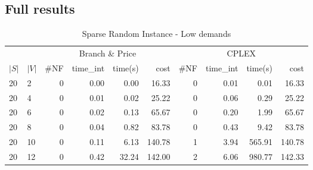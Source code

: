\appendix

\begin{appendices}
\chapter{Full results}

\begin{table*}[h]
\tiny
\begin{center}
\caption{Sparse Random Instance - Low demands}\label{tab:fullbegin}
\begin{tabular} {l l | r r r r | r r r r}
\hline
       &                                &  \multicolumn{4}{c|}{Branch \& Price}                                & \multicolumn{4}{c}{CPLEX}                 \\
 $|S|$ & $|V|$                          &  \#NF    &  time\_int    &  time(s)       &  cost          &  \#NF &  time\_int  &  time(s)       &  cost          \\ 
\hline                                                                                                                           
 20 & 2                                  &   0             & 0.00          &  0.00       &  16.33       &  0           &  0.01     &  0.01       &  16.33           \\ 
 20 & 4                                  &   0             & 0.01          &  0.02       &  25.22       &  0           &  0.06     &  0.29       &  25.22           \\ 
 20 & 6                                  &   0             & 0.02          &  0.13       &  65.67       &  0           &  0.20     &  1.99       &  65.67           \\ 
 20 & 8                                  &   0             & 0.04          &  0.82       &  83.78       &  0           &  0.43     &  9.42       &  83.78           \\ 
 20 & 10                                 &   0             & 0.11          &  6.13       &  140.78      &  1           &  3.94     &  565.91     &  140.78          \\ 
 20 & 12                                 &   0             & 0.42          &  32.24      &  142.00      &  2           &  6.06     &  980.77     &  142.33          \\ 

\end{tabular}
\end{center}
\end{table*}
\end{appendices}
